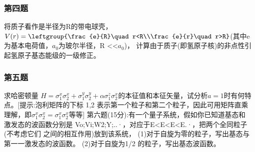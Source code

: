 \subsubsection{第四题}
将质子看作是半径为R的带电球壳，$V(r)=\leftgroup{\frac{e}{R}\quad r<R\\\frac{e}{r}\quad r>R}$(其中e为基本电荷值，$a_0$为玻尔半径，R <<$a_0$)， 计算由于质子(即氢原子核)的非点性引起氢原子基态能级的一级修正。
\subsubsection{第五题}
求哈密顿量 $H=\sigma_1^x\sigma_2^x+\sigma_1^y\sigma_2^y+\alpha \sigma_1^z\sigma^x_2$的本征值和本征矢量，试分析$a =1$时有何特点。[提示:泡利矩阵的下标 1,2 表示第一个粒子和第二个粒子，因此可用矩阵直乘理解，即$\sigma_1^x\sigma_2^x=\sigma_1^x \sigma_2^x$等等]
第六题(15分):有一个量子系统，假如你已知道基态和激发态的波函数分别是
Vo;Vi;W2;Y;..·，对应于E<E<E<E.·，把两个全同粒子 (不考虑它们
之间的相互作用)放到该系统，
(1)对于自旋为零的粒子，写出基态与第一一激发态的波函数。
(2)对于自旋为1/2 的粒子，写出基态波函数。

